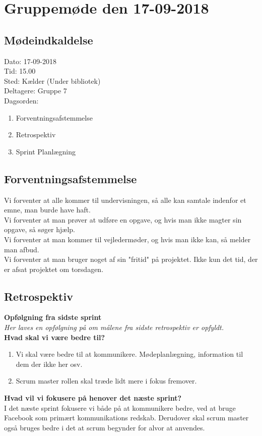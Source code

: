 \section{Gruppemøde den 17-09-2018}

\subsection{Mødeindkaldelse}
Dato: 17-09-2018
\\Tid: 15.00
\\Sted: Kælder (Under bibliotek)
\\Deltagere: Gruppe 7
\\Dagsorden:
\begin{enumerate}
    \item Forventningsafstemmelse
    \item Retrospektiv
    \item Sprint Planlægning
\end{enumerate}
\subsection{Forventningsafstemmelse}
Vi forventer at alle kommer til undervisningen, så alle kan samtale indenfor et emne, man burde have haft. 
\\Vi forventer at man prøver at udføre en opgave, og hvis man ikke magter sin opgave, så søger hjælp.
\\Vi forventer at man kommer til vejledermøder, og hvis man ikke kan, så melder man afbud.
\\Vi forventer at man bruger noget af sin "fritid" på projektet. Ikke kun det tid, der er afsat projektet om torsdagen.
\subsection{Retrospektiv}
\textbf{Opfølgning fra sidste sprint}
\\\textit{Her laves en opfølgning på om målene fra sidste retrospektiv er opfyldt.}
\\\textbf{Hvad skal vi være bedre til?}
\begin{enumerate}
    \item Vi skal være bedre til at kommunikere. Mødeplanlægning, information til dem der ikke her osv.
    \item Scrum master rollen skal træde lidt mere i fokus fremover.
\end{enumerate}
\textbf{Hvad vil vi fokusere på henover det næste sprint?}
\\I det næste sprint fokusere vi både på at kommunikere bedre, ved at bruge Facebook som primært kommunikations redskab. Derudover skal scrum master også bruges bedre i det at scrum begynder for alvor at anvendes. 